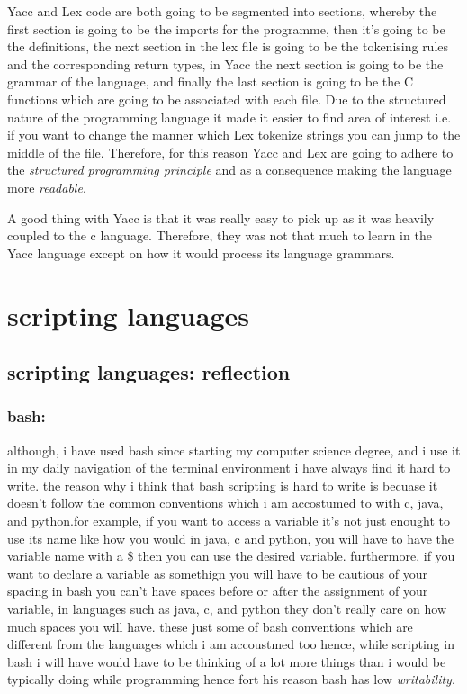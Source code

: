 \documentclass[
	12pt, %
]{fphw}
\begin{document}
Yacc and Lex code are both going to be segmented into sections, whereby the
first section is going to be the imports for the programme, then
it's going to be the definitions, the next section in the lex
file is going to be the tokenising rules and the corresponding return types,
in Yacc the next section is going to be the grammar of the
language, and finally the last section is going to be the C functions which are
going to be associated with each file. Due to the structured nature of the
programming language it made it easier to find area of interest i.e. if you want
to change the manner which Lex tokenize strings you can jump to the middle of the
file. Therefore, for this reason Yacc and Lex are going to adhere to the
\emph{structured programming principle} and as a consequence making the language
more \emph{readable}.\par

A good thing with Yacc is that it was really easy to pick up as it was heavily
coupled to the c language. Therefore, they was not that much to learn in the
Yacc language except on how it would process its language grammars.

\section{scripting languages}


\subsection{scripting languages: reflection}

\subsubsection{bash:} although, i have used bash since starting my computer science
degree, and i use it in my daily navigation of the terminal environment i have
always find it hard to write. the reason why i think that bash scripting is hard
to write is becuase it doesn't follow the common conventions which i am accostumed
to with c, java, and python.for example, if you want to access a variable it's not
just enought to use its name like how you would in java, c and python, you will have
to have the variable name with a \$ then you can use the desired variable. furthermore,
if you want to declare a variable as somethign you will have to be cautious of your
spacing in bash you can't have spaces before or after the assignment of your variable,
in languages such as java, c, and python they don't really care on how much spaces you
will have. these just some of bash conventions which are different from the
languages which i am accoustmed too hence, while scripting in bash i will have
would have to be thinking of a lot more things than i would be typically doing
while programming hence fort his reason bash has low \emph{writability}. \par
\end{document}
